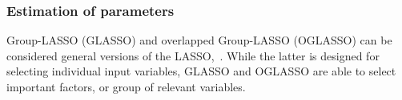 
\subsubsection*{Estimation of parameters}

Group-LASSO (GLASSO) and overlapped Group-LASSO (OGLASSO) can be considered general versions of the  LASSO,~\cite{tibshirani1996regression}. While the latter is designed for selecting individual input variables, GLASSO and OGLASSO are able to select important factors, or group of relevant variables.


